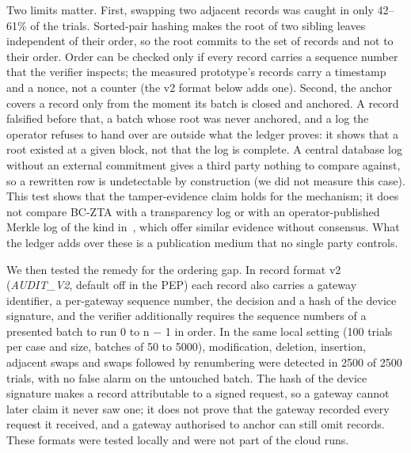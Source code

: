 \documentclass[a4paper,5p,times,twocolumn,number,sort&compress]{elsarticle}
\begin{document}
Two limits matter. First, swapping two adjacent records was caught in only 42--61\% of the trials. Sorted-pair hashing makes the root of two sibling leaves independent of their order, so the root commits to the set of records and not to their order. Order can be checked only if every record carries a sequence number that the verifier inspects; the measured prototype's records carry a timestamp and a nonce, not a counter (the v2 format below adds one). Second, the anchor covers a record only from the moment its batch is closed and anchored. A record falsified before that, a batch whose root was never anchored, and a log the operator refuses to hand over are outside what the ledger proves: it shows that a root existed at a given block, not that the log is complete. A central database log without an external commitment gives a third party nothing to compare against, so a rewritten row is undetectable by construction (we did not measure this case). This test shows that the tamper-evidence claim holds for the mechanism; it does not compare BC-ZTA with a transparency log or with an operator-published Merkle log of the kind in~\cite{yagiz26}, which offer similar evidence without consensus. What the ledger adds over these is a publication medium that no single party controls.

We then tested the remedy for the ordering gap. In record format v2 (\emph{AUDIT\_V2}, default off in the PEP) each record also carries a gateway identifier, a per-gateway sequence number, the decision and a hash of the device signature, and the verifier additionally requires the sequence numbers of a presented batch to run 0 to n $-$ 1 in order. In the same local setting (100 trials per case and size, batches of 50 to 5000), modification, deletion, insertion, adjacent swaps and swaps followed by renumbering were detected in 2500 of 2500 trials, with no false alarm on the untouched batch. The hash of the device signature makes a record attributable to a signed request, so a gateway cannot later claim it never saw one; it does not prove that the gateway recorded every request it received, and a gateway authorised to anchor can still omit records. These formats were tested locally and were not part of the cloud runs.
\end{document}
